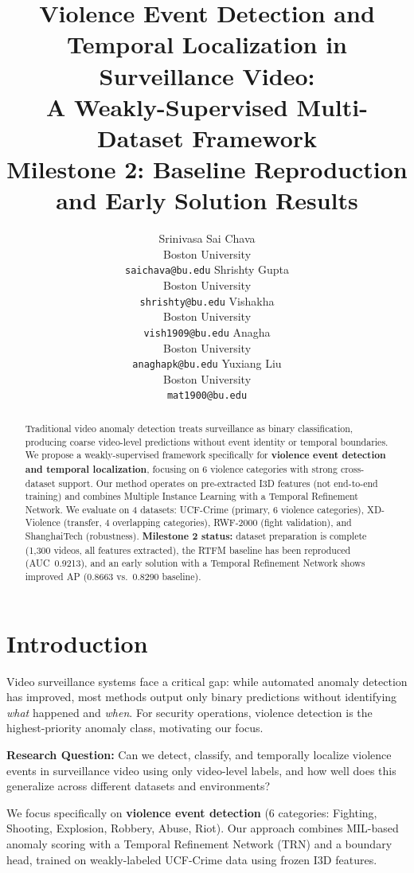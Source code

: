 \documentclass[11pt]{article}
\title{Violence Event Detection and Temporal Localization in Surveillance Video: \\
A Weakly-Supervised Multi-Dataset Framework \\
{\large Milestone 2: Baseline Reproduction and Early Solution Results}}
\author{
Srinivasa Sai Chava \\
Boston University \\
\texttt{saichava@bu.edu}
\And
Shrishty Gupta \\
Boston University \\
\texttt{shrishty@bu.edu}
\And
Vishakha \\
Boston University \\
\texttt{vish1909@bu.edu}
\AND
Anagha \\
Boston University \\
\texttt{anaghapk@bu.edu}
\And
Yuxiang Liu \\
Boston University \\
\texttt{mat1900@bu.edu}
}
\begin{document}
\maketitle

\begin{abstract}
Traditional video anomaly detection treats surveillance as binary classification, producing coarse video-level predictions without event identity or temporal boundaries. We propose a weakly-supervised framework specifically for \textbf{violence event detection and temporal localization}, focusing on 6 violence categories with strong cross-dataset support. Our method operates on pre-extracted I3D features (not end-to-end training) and combines Multiple Instance Learning with a Temporal Refinement Network. We evaluate on 4 datasets: UCF-Crime (primary, 6 violence categories), XD-Violence (transfer, 4 overlapping categories), RWF-2000 (fight validation), and ShanghaiTech (robustness). \textbf{Milestone 2 status:} dataset preparation is complete (1,300 videos, all features extracted), the RTFM baseline has been reproduced (AUC~0.9213), and an early solution with a Temporal Refinement Network shows improved AP (0.8663 vs.\ 0.8290 baseline).
\end{abstract}

\section{Introduction}
Video surveillance systems face a critical gap: while automated anomaly detection has improved, most methods output only binary predictions without identifying \textit{what} happened and \textit{when}. For security operations, violence detection is the highest-priority anomaly class, motivating our focus.

\textbf{Research Question:} Can we detect, classify, and temporally localize violence events in surveillance video using only video-level labels, and how well does this generalize across different datasets and environments?

We focus specifically on \textbf{violence event detection} (6 categories: Fighting, Shooting, Explosion, Robbery, Abuse, Riot). Our approach combines MIL-based anomaly scoring with a Temporal Refinement Network (TRN) and a boundary head, trained on weakly-labeled UCF-Crime data using frozen I3D features.
\end{document}
